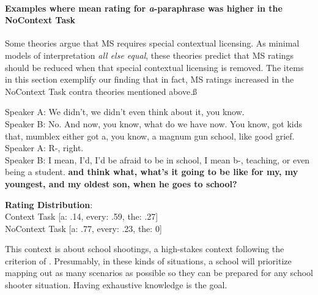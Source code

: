 \documentclass[12pt,letterpaper,table,svgnames,dvipsnames]{article}
\begin{document}
\paragraph{Examples where mean rating for \emph{a}-paraphrase was higher in the NoContext Task} 

Some theories argue that MS requires special contextual licensing. As minimal models of interpretation \emph{all else equal}, these theories predict that MS ratings should be reduced when that special contextual licensing is removed. The items in this section exemplify our finding that in fact, MS ratings increased in the NoContext Task contra theories mentioned above.ß

\begin{exe}
    \ex {}
    \begin{xlist}
    \ex {}
    Speaker A: We didn't, we didn't even think about it, you know.\\
    Speaker B: No. And now, you know, what do we have now. You know, got kids that, mumblex either got a, you know, a magnum gun school, like good grief.\\
    Speaker A: R-, right.\\
    Speaker B: I mean, I'd, I'd be afraid to be in school, I mean b-, teaching, or even being a student. \textbf{and think what, what's it going to be like for my, my youngest, and my oldest son, when he goes to school?}
    
    \ex \textbf{Rating Distribution}:\\
    Context Task [a: .14, every: .59, the: .27]\\
    NoContext Task [a: .77, every: .23, the: 0]
    \end{xlist}
\end{exe}
This context is about school shootings, a high-stakes context following the criterion of . Presumably, in these kinds of situations, a school will prioritize mapping out as many scenarios as possible so they can be prepared for any school shooter situation. Having exhaustive knowledge is the goal. 


        
\end{document}
